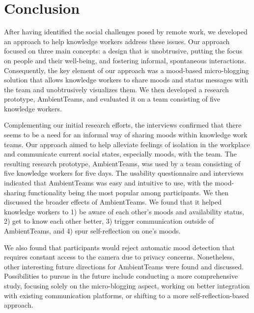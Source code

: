 \chapter{Conclusion}
\label{chapter:conclusion}
After having identified the social challenges posed by remote work, we developed an approach to help knowledge workers address these issues. Our approach focused on three main concepts: a design that is unobtrusive, putting the focus on people and their well-being, and fostering informal, spontaneous interactions. Consequently, the key element of our approach was a mood-based micro-blogging solution that allows knowledge workers to share moods and status messages with the team and unobtrusively visualizes them. We then developed a research prototype, AmbientTeams, and evaluated it on a team consisting of five knowledge workers.

Complementing our initial research efforts, the interviews confirmed that there seems to be a need for an informal way of sharing moods within knowledge work teams. Our approach aimed to help alleviate feelings of isolation in the workplace and communicate current social states, especially moods, with the team. The resulting research prototype, AmbientTeams, was used by a team consisting of five knowledge workers for five days. The usability questionnaire and interviews indicated that AmbientTeams was easy and intuitive to use, with the mood-sharing functionality being the most popular among participants. We then discussed the broader effects of AmbientTeams. We found that it helped knowledge workers to 1) be aware of each other's moods and availability status, 2) get to know each other better, 3) trigger communication outside of AmbientTeams, and 4) spur self-reflection on one's moods.

We also found that participants would reject automatic mood detection that requires constant access to the camera due to privacy concerns. Nonetheless, other interesting future directions for AmbientTeams were found and discussed. Possibilities to pursue in the future include conducting a more comprehensive study, focusing solely on the micro-blogging aspect, working on better integration with existing communication platforms, or shifting to a more self-reflection-based approach.